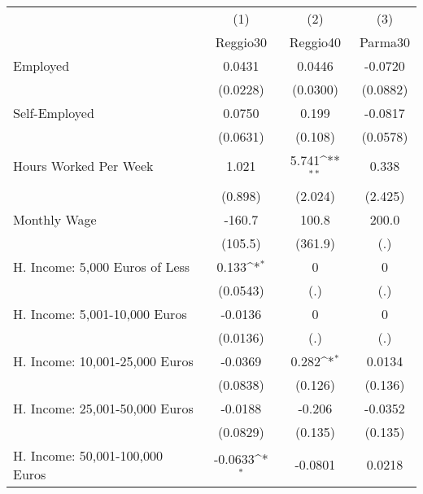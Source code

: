 {
\def\sym#1{\ifmmode^{#1}\else\(^{#1}\)\fi}
\begin{tabular}{l*{3}{c}}
\toprule
            &\multicolumn{1}{c}{(1)}&\multicolumn{1}{c}{(2)}&\multicolumn{1}{c}{(3)}\\
            &\multicolumn{1}{c}{Reggio30}&\multicolumn{1}{c}{Reggio40}&\multicolumn{1}{c}{Parma30}\\
\midrule
Employed    &      0.0431         &      0.0446         &     -0.0720         \\
            &    (0.0228)         &    (0.0300)         &    (0.0882)         \\
\addlinespace
Self-Employed&      0.0750         &       0.199         &     -0.0817         \\
            &    (0.0631)         &     (0.108)         &    (0.0578)         \\
\addlinespace
Hours Worked Per Week&       1.021         &       5.741\sym{**} &       0.338         \\
            &     (0.898)         &     (2.024)         &     (2.425)         \\
\addlinespace
Monthly Wage&      -160.7         &       100.8         &       200.0         \\
            &     (105.5)         &     (361.9)         &         (.)         \\
\addlinespace
H. Income: 5,000 Euros of Less&       0.133\sym{*}  &           0         &           0         \\
            &    (0.0543)         &         (.)         &         (.)         \\
\addlinespace
H. Income: 5,001-10,000 Euros&     -0.0136         &           0         &           0         \\
            &    (0.0136)         &         (.)         &         (.)         \\
\addlinespace
H. Income: 10,001-25,000 Euros&     -0.0369         &       0.282\sym{*}  &      0.0134         \\
            &    (0.0838)         &     (0.126)         &     (0.136)         \\
\addlinespace
H. Income: 25,001-50,000 Euros&     -0.0188         &      -0.206         &     -0.0352         \\
            &    (0.0829)         &     (0.135)         &     (0.135)         \\
\addlinespace
H. Income: 50,001-100,000 Euros&     -0.0633\sym{*}  &     -0.0801         &      0.0218         \\

\end{tabular}}
